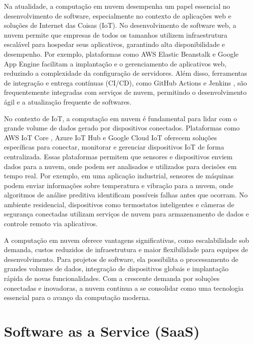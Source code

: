 Na atualidade, a computação em nuvem desempenha um papel essencial no desenvolvimento de software, especialmente no contexto de aplicações web e soluções de Internet das Coisas (\acrshort{IoT}). No desenvolvimento de software web, a nuvem permite que empresas de todos os tamanhos utilizem infraestrutura escalável para hospedar seus aplicativos, garantindo alta disponibilidade e desempenho. Por exemplo, plataformas como AWS Elastic Beanstalk \cite{AWS_BEANS} e Google App Engine \cite{GOOGLE_APP_ENGINE} facilitam a implantação e o gerenciamento de aplicativos web, reduzindo a complexidade da configuração de servidores. Além disso, ferramentas de integração e entrega contínuas (CI/CD), como GitHub Actions \cite{GITHUB_ACTIONS} e Jenkins \cite{JENKINS}, são frequentemente integradas com serviços de nuvem, permitindo o desenvolvimento ágil e a atualização frequente de softwares.

No contexto de IoT, a computação em nuvem é fundamental para lidar com o grande volume de dados gerado por dispositivos conectados. Plataformas como AWS IoT Core \cite{AWS_IoT}, Azure IoT Hub \cite{AZURE_IoT} e Google Cloud IoT \cite{GOOGLE_IoT} oferecem soluções específicas para conectar, monitorar e gerenciar dispositivos IoT de forma centralizada. Essas plataformas permitem que sensores e dispositivos enviem dados para a nuvem, onde podem ser analisados e utilizados para decisões em tempo real. Por exemplo, em uma aplicação industrial, sensores de máquinas podem enviar informações sobre temperatura e vibração para a nuvem, onde algoritmos de análise preditiva identificam possíveis falhas antes que ocorram. No ambiente residencial, dispositivos como termostatos inteligentes e câmeras de segurança conectadas utilizam serviços de nuvem para armazenamento de dados e controle remoto via aplicativos.

A computação em nuvem oferece vantagens significativas, como escalabilidade sob demanda, custos reduzidos de infraestrutura e maior flexibilidade para equipes de desenvolvimento. Para projetos de software, ela possibilita o processamento de grandes volumes de dados, integração de dispositivos globais e implantação rápida de novas funcionalidades. Com a crescente demanda por soluções conectadas e inovadoras, a nuvem continua a se consolidar como uma tecnologia essencial para o avanço da computação moderna.

\section{Software as a Service (SaaS)}

